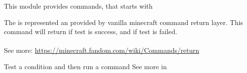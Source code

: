 This module provides  commands, that starts with 

The  is represented an  provided by vanilla minecraft command return layer.
This command will return  if test is success, and  if test is failed.\\\\
See more: \url{https://minecraft.fandom.com/wiki/Commands/return}

\begin{example}{Test a condition and then run a command}
    See more in~\\
\end{example}
